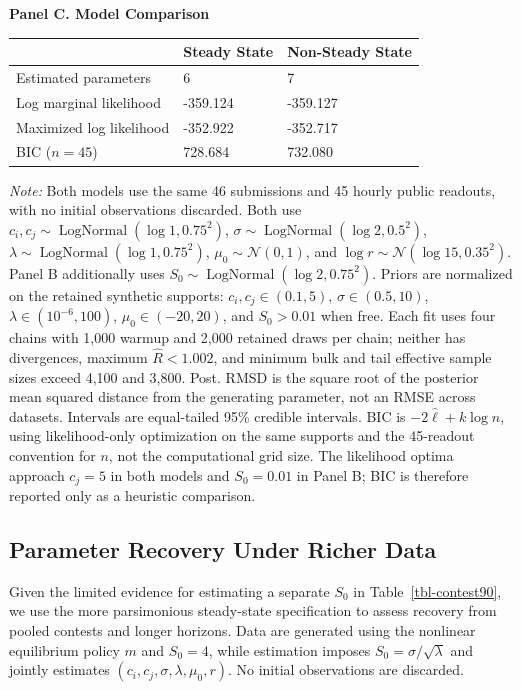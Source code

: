 \documentclass[mnsc]{informs3}
\begin{document}
\begin{table}[!htbp]
\textbf{Panel C. Model Comparison}\par
\smallskip
\begin{tabularx}{\textwidth}{lYY}
\toprule
 & Steady State & Non-Steady State \\
\midrule
Estimated parameters & 6 & 7 \\
Log marginal likelihood & -359.124 & -359.127 \\
Maximized log likelihood & -352.922 & -352.717 \\
BIC ($n=45$) & 728.684 & 732.080 \\
\bottomrule
\end{tabularx}
\begin{minipage}{\textwidth}
{\footnotesize
\medskip
\textit{Note:} Both models use the same 46 submissions and 45 hourly public readouts, with no initial observations discarded. Both use $c_i,c_j\sim\operatorname{LogNormal}(\log1,0.75^2)$, $\sigma\sim\operatorname{LogNormal}(\log2,0.5^2)$, $\lambda\sim\operatorname{LogNormal}(\log1,0.75^2)$, $\mu_0\sim\mathcal N(0,1)$, and $\log r\sim\mathcal N(\log15,0.35^2)$. Panel B additionally uses $S_0\sim\operatorname{LogNormal}(\log2,0.75^2)$. Priors are normalized on the retained synthetic supports: $c_i,c_j\in(0.1,5)$, $\sigma\in(0.5,10)$, $\lambda\in(10^{-6},100)$, $\mu_0\in(-20,20)$, and $S_0>0.01$ when free. Each fit uses four chains with 1,000 warmup and 2,000 retained draws per chain; neither has divergences, maximum $\widehat R<1.002$, and minimum bulk and tail effective sample sizes exceed 4,100 and 3,800. Post. RMSD is the square root of the posterior mean squared distance from the generating parameter, not an RMSE across datasets. Intervals are equal-tailed 95\% credible intervals. BIC is $-2\hat\ell+k\log n$, using likelihood-only optimization on the same supports and the 45-readout convention for $n$, not the computational grid size. The likelihood optima approach $c_j=5$ in both models and $S_0=0.01$ in Panel B; BIC is therefore reported only as a heuristic comparison.
}
\end{minipage}
\end{table}


\subsection{Parameter Recovery Under Richer Data}\label{sect-synthetic-richer}

{Given the limited evidence for estimating a separate $S_0$ in Table~\ref{tbl-contest90}, we use the more parsimonious steady-state specification to assess recovery from pooled contests and longer horizons. Data are generated using the nonlinear equilibrium policy $m$ and $S_0=4$, while estimation imposes $S_0=\sigma/\sqrt\lambda$ and jointly estimates $(c_i,c_j,\sigma,\lambda,\mu_0,r)$. No initial observations are discarded.}
\end{document}

